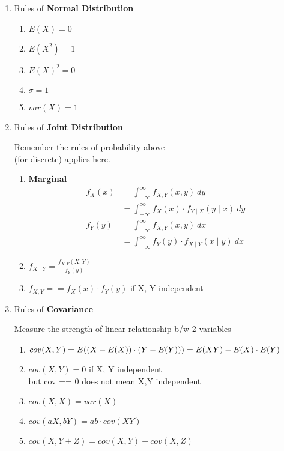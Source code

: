 \documentclass{article}
\begin{document}
\begin{small}
\begin{multicols}{2}
\begin{enumerate}
\item Rules of \textbf{Normal Distribution}
  \begin{enumerate}
  \item $E(X) = 0$
  \item $E(X^2) = 1$
  \item $E(X)^2 = 0$
  \item $\sigma = 1$
  \item $var(X) = 1$
  \end{enumerate}
\item Rules of \textbf{Joint Distribution}

Remember the rules of probability above\\(for discrete) applies here. 

  \begin{enumerate}
  \item\textbf{Marginal}
  \begin{align*}
  f_X(x) & = \int_{-\infty}^{\infty} f_{X,Y}(x, y) \ dy \\
         & = \int_{-\infty}^{\infty} f_X(x) \cdot f_{Y \mid X}(y \mid x) \ dy \\
  f_Y(y) & = \int_{-\infty}^{\infty} f_{X,Y}(x, y) \ dx \\
         & = \int_{-\infty}^{\infty} f_Y(y) \cdot f_{X \mid Y}(x \mid y) \ dx
  \end{align*}
  \item $f_{X \mid Y} = \frac{f_{X, Y}(X, Y)}{f_Y(y)}$
  \item $f_{X, Y} == f_X(x) \cdot f_Y(y)$ if X, Y independent
  \end{enumerate}

\item Rules of \textbf{Covariance}

Measure the strength of linear relationship b/w 2 variables

  \begin{enumerate}
  \item $cov(X, Y) = E((X - E(X))\cdot(Y - E(Y)))\\= E(XY) - E(X) \cdot E(Y)$
  \item $cov(X, Y) = 0$ if X, Y independent \\
        but cov == 0 does not mean X,Y independent
  \item $cov(X, X) = var(X)$
  \item $cov(aX, bY) = ab \cdot cov(XY)$
  \item $cov(X, Y+Z) = cov(X, Y) + cov(X, Z)$
  \end{enumerate}


\end{enumerate}
\end{multicols}
\end{small}
\end{document}
